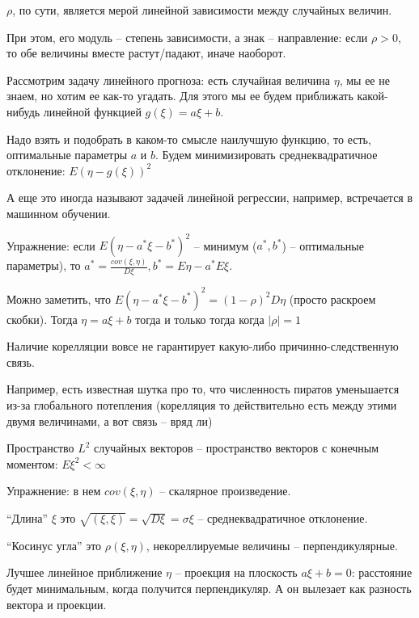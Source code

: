 \begin{Rem}

    $\rho$, по сути, является мерой линейной зависимости между случайных величин. 

    При этом, его модуль -- степень зависимости, а знак -- направление: если $\rho > 0$, то обе величины вместе растут/падают, иначе наоборот.
\end{Rem}

Рассмотрим задачу линейного прогноза: есть случайная величина $\eta$, мы ее не знаем, но хотим ее как-то угадать.
Для этого мы ее будем приближать какой-нибудь линейной функцией $g(\xi) = a\xi + b$. 

Надо взять и подобрать в каком-то смысле наилучшую функцию, то есть, оптимальные параметры $a$ и $b$. 
Будем минимизировать среднеквадратичное отклонение: $E(\eta - g(\xi))^2$
\begin{Rem}
А еще это иногда называют задачей линейной регрессии, например, встречается в машинном обучении.
\end{Rem}

Упражнение: если $E(\eta - a^*\xi -b^*)^2$ -- минимум ($a^*, b^*$) -- оптимальные параметры), то $a^* = \frac{cov(\xi, \eta)}{D\xi}, b^* = E\eta - a^*E\xi$.

Можно заметить, что $E(\eta - a^*\xi -b^*)^2 = (1 - \rho)^2 D\eta$ (просто раскроем скобки). Тогда $\eta =  a\xi + b$ тогда и только тогда когда $|\rho| = 1$

\begin{Rem}
Наличие корелляции вовсе не гарантирует какую-либо причинно-следственную связь. 

Например, есть известная шутка про то, что численность пиратов уменьшается из-за глобального потепления (корелляция то действительно есть между этими двумя величинами, а вот связь -- вряд ли) 
\end{Rem}

\begin{Def}
Пространство $L^2$ случайных векторов -- пространство векторов с конечным моментом: $E \xi^2 < \infty$
\end{Def}

Упражнение: в нем $cov(\xi, \eta)$ -- скалярное произведение.

``Длина'' $\xi$ это $\sqrt{(\xi, \xi)} = \sqrt{D\xi} = \sigma \xi$ -- среднеквадратичное отклонение.

``Косинус угла'' это $\rho(\xi, \eta)$, некореллируемые величины -- перпендикулярные.

Лучшее линейное приближение $\eta$ -- проекция на плоскость $a\xi + b = 0$: расстояние будет минимальным, когда получится перпендикуляр.
А он вылезает как разность вектора и проекции. 


